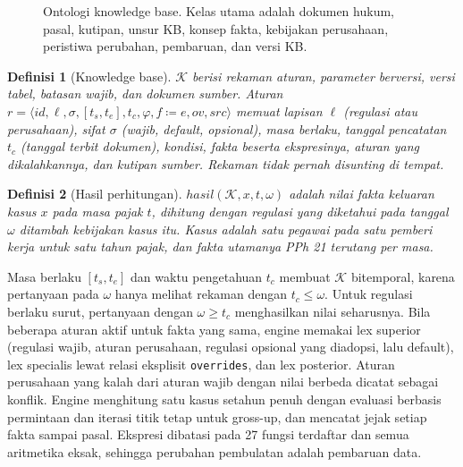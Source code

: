 \documentclass[conference]{IEEEtran}
\makeatletter
\DeclareRobustCommand{\en}[1]{{\usefont{\f@encoding}{\f@family}{\f@series}{it}#1\/}}
\newtheorem{definisi}{Definisi}
\newcommand{\K}{\mathcal{K}}
\newcommand{\hasil}{\mathit{hasil}}
\makeatother
\begin{document}
\begin{figure}[t]
\centering

\caption{Ontologi \en{knowledge base}. Kelas utama adalah dokumen hukum, pasal, kutipan, unsur KB, konsep fakta, kebijakan perusahaan, peristiwa perubahan, pembaruan, dan versi KB.}
\label{fig:ontologi}
\end{figure}

\begin{definisi}[\en{Knowledge base}]
\label{def:kb}
$\K$ berisi rekaman aturan, parameter berversi, versi tabel, batasan wajib, dan dokumen sumber. Aturan $r = \langle \mathit{id}, \ell, \sigma, [t_s, t_e], t_c, \varphi, f \coloneqq e, \mathit{ov}, \mathit{src} \rangle$ memuat lapisan $\ell$ (regulasi atau perusahaan), sifat $\sigma$ (wajib, \en{default}, opsional), masa berlaku, tanggal pencatatan $t_c$ (tanggal terbit dokumen), kondisi, fakta beserta ekspresinya, aturan yang dikalahkannya, dan kutipan sumber. Rekaman tidak pernah disunting di tempat.
\end{definisi}

\begin{definisi}[Hasil perhitungan]
\label{def:hasil}
$\hasil(\K, x, t, \omega)$ adalah nilai fakta keluaran kasus $x$ pada masa pajak $t$, dihitung dengan regulasi yang diketahui pada tanggal $\omega$ ditambah kebijakan kasus itu. Kasus adalah satu pegawai pada satu pemberi kerja untuk satu tahun pajak, dan fakta utamanya PPh 21 terutang per masa.
\end{definisi}

Masa berlaku $[t_s, t_e]$ dan waktu pengetahuan $t_c$ membuat $\K$ bitemporal, karena pertanyaan pada $\omega$ hanya melihat rekaman dengan $t_c \leq \omega$. Untuk regulasi berlaku surut, pertanyaan dengan $\omega \geq t_c$ menghasilkan nilai seharusnya. Bila beberapa aturan aktif untuk fakta yang sama, \en{engine} memakai \en{lex superior} (regulasi wajib, aturan perusahaan, regulasi opsional yang diadopsi, lalu \en{default}), \en{lex specialis} lewat relasi eksplisit \texttt{overrides}, dan \en{lex posterior}. Aturan perusahaan yang kalah dari aturan wajib dengan nilai berbeda dicatat sebagai konflik. \en{Engine} menghitung satu kasus setahun penuh dengan evaluasi berbasis permintaan dan iterasi titik tetap untuk \en{gross-up}, dan mencatat jejak setiap fakta sampai pasal. Ekspresi dibatasi pada 27 fungsi terdaftar dan semua aritmetika eksak, sehingga perubahan pembulatan adalah pembaruan data.

\end{document}
